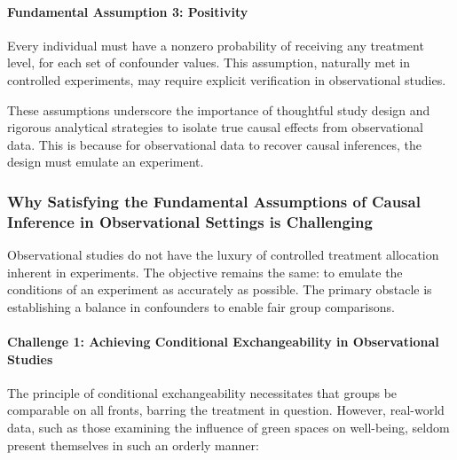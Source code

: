 \documentclass[
  singlecolumn]{article}
\let\oldparagraph\paragraph
\renewcommand{\paragraph}[1]{\oldparagraph{#1}\mbox{}}
\begin{document}
\paragraph{Fundamental Assumption 3:
Positivity}\label{fundamental-assumption-3-positivity}

Every individual must have a nonzero probability of receiving any
treatment level, for each set of confounder values. This assumption,
naturally met in controlled experiments, may require explicit
verification in observational studies.

These assumptions underscore the importance of thoughtful study design
and rigorous analytical strategies to isolate true causal effects from
observational data. This is because for observational data to recover
causal inferences, the design must emulate an experiment.

\subsubsection{Why Satisfying the Fundamental Assumptions of Causal
Inference in Observational Settings is
Challenging}\label{why-satisfying-the-fundamental-assumptions-of-causal-inference-in-observational-settings-is-challenging}

Observational studies do not have the luxury of controlled treatment
allocation inherent in experiments. The objective remains the same: to
emulate the conditions of an experiment as accurately as possible. The
primary obstacle is establishing a balance in confounders to enable fair
group comparisons.

\paragraph{Challenge 1: Achieving Conditional Exchangeability in
Observational
Studies}\label{challenge-1-achieving-conditional-exchangeability-in-observational-studies}

The principle of conditional exchangeability necessitates that groups be
comparable on all fronts, barring the treatment in question. However,
real-world data, such as those examining the influence of green spaces
on well-being, seldom present themselves in such an orderly manner:
\end{document}
